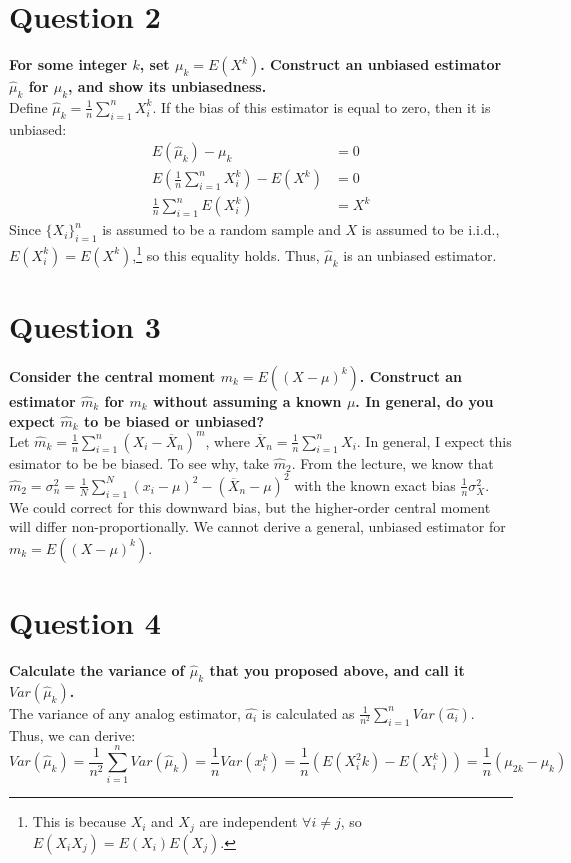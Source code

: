 \documentclass{article}
\newcommand{\olx}[1]{\overline{X}_{#1}}
\newcommand{\est}[1]{\frac{1}{#1}\sum_{i=1}^{#1}}
\begin{document}
\pagebreak
\section*{Question 2}
\textbf{For some integer $k$, set $\mu_k=E(X^k)$. Construct an unbiased estimator $\hat{\mu}_k$ for $\mu_k$, and show its unbiasedness.}
\bigskip \\
Define $\hat{\mu}_k = \frac{1}{n}\sum_{i=1}^nX_i^k$. If the bias of this estimator is equal to zero, then it is unbiased:
\begin{align*}
	E(\hat{\mu}_k)-\mu_k &= 0						\\
	E(\frac{1}{n}\sum_{i=1}^nX_i^k) - E(X^k) &= 0	\\
	\frac{1}{n}\sum_{i=1}^nE(X_i^k) &= X^k			
\end{align*}
Since $\{X_i\}_{i=1}^n$ is assumed to be a random sample and $X$ is assumed to be i.i.d., $E(X_i^k)=E(X^k)$,\footnote{This is because $X_i$ and $X_j$ are independent $\forall i\neq j$, so $E(X_iX_j)=E(X_i)E(X_j)$.} so this equality holds. Thus, $\hat{\mu}_k$ is an unbiased estimator.


\section*{Question 3}
\textbf{Consider the central moment $m_k=E((X-\mu)^k)$. Construct an estimator $\hat{m}_k$ for $m_k$ without assuming a known $\mu$. In general, do you expect $\hat{m}_k$ to be biased or unbiased?}
\bigskip \\
Let $\hat{m}_k = \frac{1}{n}\sum_{i=1}^n (X_i - \olx{n})^m$, where $\olx{n} = \est{n} X_i$. In general, I expect this esimator to be be biased. To see why, take $\hat{m}_2$. From the lecture, we know that $\hat{m}_2=\sigma_n^2=\est{N}(x_i-\mu)^2-(\olx{n}-\mu)^2$ with the known exact bias $\frac{1}{n}\sigma_X^2$. We could correct for this downward bias, but the higher-order central moment will differ non-proportionally. We cannot derive a general, unbiased estimator for $m_k=E((X-\mu)^k)$.



\section*{Question 4}
\textbf{Calculate the variance of $\hat{\mu}_k$ that you proposed above, and call it $Var(\hat{\mu}_k)$.}
\bigskip \\
The variance of any analog estimator, $\hat{a_i}$ is calculated as $\frac{1}{n^2}\sum_{i=1}^n Var(\hat{a_i})$. Thus, we can derive:
\[
	Var(\hat{\mu}_k) = \frac{1}{n^2}\sum_{i=1}^n Var(\hat{\mu}_k) = \frac{1}{n}Var(x^k_i) = \frac{1}{n}\left(E(X_i^2k) - E(X_i^k)\right) = \frac{1}{n}(\mu_{2k}-\mu_k)
\]
\end{document}
